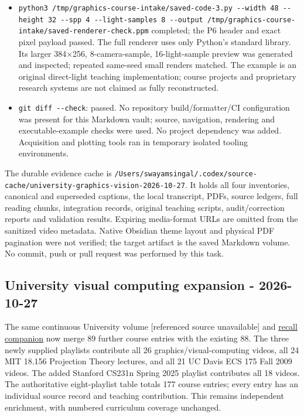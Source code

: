 \begin{itemize}
\item
  \texttt{python3\ /tmp/graphics-course-intake/saved-code-3.py\ -\/-width\ 48\ -\/-height\ 32\ -\/-spp\ 4\ -\/-light-samples\ 8\ -\/-output\ /tmp/graphics-course-intake/saved-renderer-check.ppm} completed; the P6 header and exact pixel payload passed. The full renderer uses only Python's standard library. Its larger 384×256, 8-camera-sample, 16-light-sample preview was generated and inspected; repeated same-seed small renders matched. The example is an original direct-light teaching implementation; course projects and proprietary research systems are not claimed as fully reconstructed.
\item
  \texttt{git\ diff\ -\/-check}: passed. No repository build/formatter/CI configuration was present for this Markdown vault; source, navigation, rendering and executable-example checks were used. No project dependency was added. Acquisition and plotting tools ran in temporary isolated tooling environments.
\end{itemize}

The durable evidence cache is \texttt{/Users/swayamsingal/.codex/source-cache/university-graphics-vision-2026-10-27}. It holds all four inventories, canonical and superseded captions, the local transcript, PDFs, source ledgers, full reading chunks, integration records, original teaching scripts, audit/correction reports and validation results. Expiring media-format URLs are omitted from the sanitized video metadata. Native Obsidian theme layout and physical PDF pagination were not verified; the target artifact is the saved Markdown volume. No commit, push or pull request was performed by this task.

\subsection{University visual computing expansion - 2026-10-27}\label{appendix-a103e7846d21-university-visual-computing-expansion---2026-10-27}

The same {continuous University volume {[}referenced source unavailable{]}} and \hyperref[appendix-a8f634b076b5]{recall companion} now merge 89 further course entries with the existing 88. The three newly supplied playlists contribute all 26 graphics/visual-computing videos, all 24 MIT 18.156 Projection Theory lectures, and all 21 UC Davis ECS 175 Fall 2009 videos. The added Stanford CS231n Spring 2025 playlist contributes all 18 videos. The authoritative eight-playlist table totals 177 course entries; every entry has an individual source record and teaching contribution. This remains independent enrichment, with numbered curriculum coverage unchanged.

